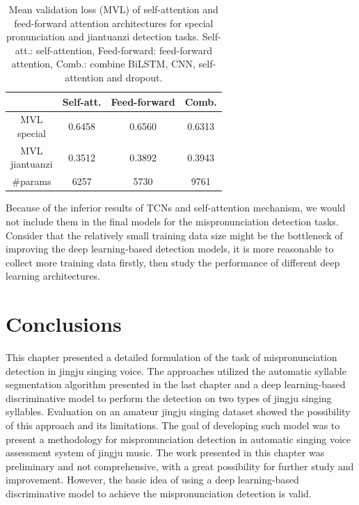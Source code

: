 \begin{table}[ht!]
\centering
\caption{Mean validation loss (MVL) of self-attention and feed-forward attention architectures for special pronunciation and jiantuanzi detection tasks. Self-att.: self-attention, Feed-forward: feed-forward attention, Comb.: combine BiLSTM, CNN, self-attention and dropout.}
\label{tab:ch6:results_self_att_val}
\begin{tabular}{cccc}
\toprule
& Self-att. & Feed-forward & Comb. \\
\midrule
\makecell{MVL\\special} & 0.6458 & 0.6560 & 0.6313 \\
\makecell{MVL\\jiantuanzi} & 0.3512 & 0.3892 & 0.3943 \\
\#params & 6257 & 5730 & 9761 \\
\bottomrule
\end{tabular}
\end{table}

Because of the inferior results of TCNs and self-attention mechanism, we would not include them in the final models for the mispronunciation detection tasks. Consider that the relatively small training data size might be the bottleneck of improving the deep learning-based detection models, it is more reasonable to collect more training data firstly, then study the performance of different deep learning architectures.

\section{Conclusions} 

This chapter presented a detailed formulation of the task of mispronunciation detection in jingju singing voice. The approaches utilized the automatic syllable segmentation algorithm presented in the last chapter and a deep learning-based discriminative model to perform the detection on two types of jingju singing syllables. Evaluation on an amateur jingju singing dataset showed the possibility of this approach and its limitations. The goal of developing such model was to present a methodology for mispronunciation detection in automatic singing voice assessment system of jingju music. The work presented in this chapter was preliminary and not comprehensive, with a great possibility for further study and improvement. However, the basic idea of using a deep learning-based discriminative model to achieve the mispronunciation detection is valid.

